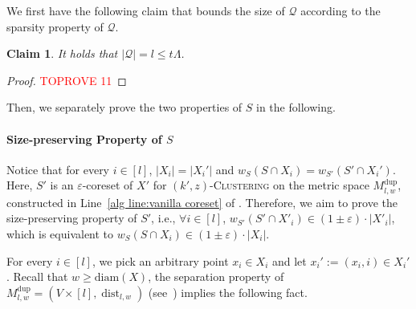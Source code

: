 \documentclass[letterpaper,11pt]{article}
\theoremstyle{plain}
\newtheorem{claim}[theorem]{Claim}
\theoremstyle{definition}
\theoremstyle{remark}
\DeclareMathOperator{\dist}{dist}
\newcommand{\diam}{\mathrm{diam}}
\newcommand{\dup}{\mathrm{dup}}
\newcommand{\multi}{\mathrm{dup}}
\newcommand{\eps}{\varepsilon}
\newcommand{\calQ}{\mathcal{Q}}
\newcommand{\ProblemName}[1]{\textsc{#1}}
\newcommand{\tzC}[1]{\ProblemName{$(#1,z)$-Clustering}\xspace}
\begin{document}
We first have the following claim that bounds the size of $\calQ$ according to the sparsity property of $\calQ$.

\begin{claim}
    \label{claim:bounded Q}
    It holds that $|\calQ|=l\le t\Lambda$.
\end{claim}
\begin{proof}\textcolor{red}{TOPROVE 11}\end{proof}


Then, we separately prove the two properties of $S$ in the following.

\paragraph{Size-preserving Property of $S$} 
Notice that for every $i \in [l]$, $|X_i| = |X_i'|$ and $w_S(S \cap X_i) = w_{S'}(S' \cap X_i')$. Here, $S'$ is an $\eps$-coreset of $X'$ for \tzC{k'} on the metric space $M^\dup_{l,w}$, constructed in Line~\ref{alg line:vanilla coreset} of . Therefore, we aim to prove the size-preserving property of $S'$, i.e., $\forall i\in [l]$, $w_{S'}(S'\cap X'_i)\in (1\pm \eps)\cdot |X'_i|$, which is equivalent to $w_{S}(S\cap X_i)\in (1\pm \eps)\cdot |X_i|$.


For every $i\in [l]$, we pick an arbitrary point $x_i\in X_i$ and let $x_i':=(x_i,i)\in X_i'$. 
Recall that $w\ge \diam(X)$, the separation property of $M^\multi_{l,w} = (V\times [l], \dist_{l,w})$ (see~) implies the following fact.
\end{document}
